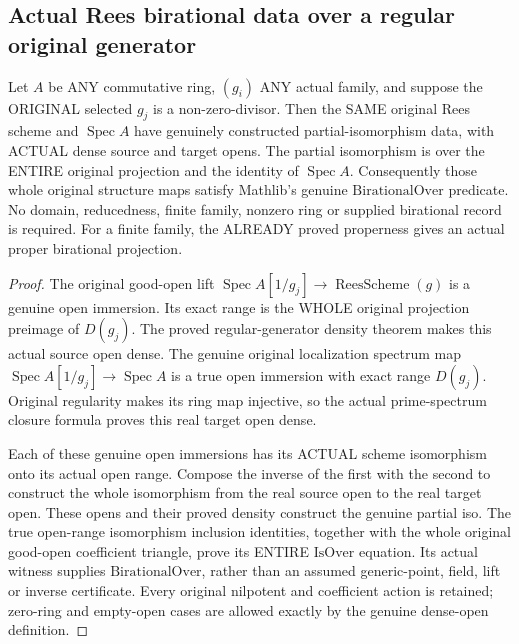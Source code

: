 \subsection{Actual Rees birational data over a regular original generator}

\begin{theorem}
\label{scheme:actual-rees-regular-birational-data}
Let $A$ be ANY commutative ring, $(g_i)$ ANY actual family, and suppose the
ORIGINAL selected $g_j$ is a non-zero-divisor. Then the SAME original Rees
scheme and $\operatorname{Spec}A$ have genuinely constructed partial-isomorphism
data, with ACTUAL dense source and target opens. The partial isomorphism is
over the ENTIRE original projection and the identity of $\operatorname{Spec}A$.
Consequently those whole original structure maps satisfy Mathlib's genuine
$\mathrm{BirationalOver}$ predicate. No domain, reducedness, finite family,
nonzero ring or supplied birational record is required. For a finite family,
the ALREADY proved properness gives an actual proper birational projection.
\leanok
\end{theorem}
\begin{proof}
The original good-open lift $\operatorname{Spec}A[1/g_j]\to\operatorname{ReesScheme}(g)$
is a genuine open immersion. Its exact range is the WHOLE original projection
preimage of $D(g_j)$. The proved regular-generator density theorem makes this
actual source open dense. The genuine original localization spectrum map
$\operatorname{Spec}A[1/g_j]\to\operatorname{Spec}A$ is a true open immersion
with exact range $D(g_j)$. Original regularity makes its ring map injective,
so the actual prime-spectrum closure formula proves this real target open dense.

Each of these genuine open immersions has its ACTUAL scheme isomorphism onto
its actual open range. Compose the inverse of the first with the second to
construct the whole isomorphism from the real source open to the real target
open. These opens and their proved density construct the genuine partial iso.
The true open-range isomorphism inclusion identities, together with the whole
original good-open coefficient triangle, prove its ENTIRE $\mathrm{IsOver}$
equation. Its actual witness supplies $\mathrm{BirationalOver}$, rather than
an assumed generic-point, field, lift or inverse certificate. Every original
nilpotent and coefficient action is retained; zero-ring and empty-open cases
are allowed exactly by the genuine dense-open definition.
\end{proof}
